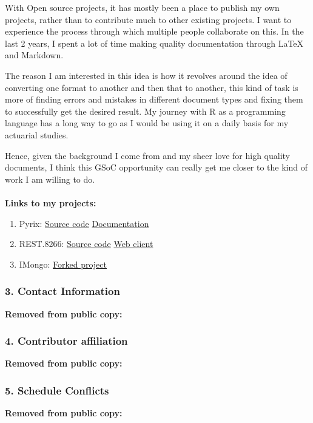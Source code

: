 \documentclass[12pt]{article}
\begin{document}
With Open source projects, it has mostly been a place to publish my own projects, rather than to contribute much to other existing projects. I want to experience the process through which multiple people collaborate on this.  In the last 2 years, I spent a lot of time making quality documentation through LaTeX and Markdown. 
 
    The reason I am interested in this idea is how it revolves around the idea of converting one format
to another and then that to another, this kind of task is more of finding errors and mistakes in different document types and fixing them to successfully get the desired result. My journey with R as a programming language has a long way to go as I would be using it on a daily basis for my actuarial studies. 

    Hence, given the background I come from and my sheer love for high quality documents, I
think this GSoC opportunity can really get me closer to the kind of work I am willing to do.\\
\\
{\large\bfseries Links to my projects:}\\
\begin{enumerate}[label = {  \color{MediumBlue} \textbf{\arabic*. }},align=left]
 \item Pyrix: \href{https://github.com/Abhi-1U/pyrix}{\color{orange}Source code} \href{https://abhi-1u.github.io/pyrix-docs/}{\color{orange}Documentation}
 \item REST.8266: \href{https://github.com/Abhi-1U/REST.8266}{\color{orange}Source code} \href{https://github.com/Abhi-1U/REST.8266.web.client}{\color{orange}Web client}
 \item IMongo: \href{https://github.com/Abhi-1U/imongo}{\color{orange}Forked project}
\end{enumerate}

\subsubsection{3. Contact Information}
{\large\bfseries \color{MediumBlue} Removed from public copy:} 
\subsubsection{4. Contributor affiliation}
{\large\bfseries \color{MediumBlue} Removed from public copy:}
\subsubsection{5. Schedule Conflicts}
{\large\bfseries \color{MediumBlue} Removed from public copy:}
\end{document}
